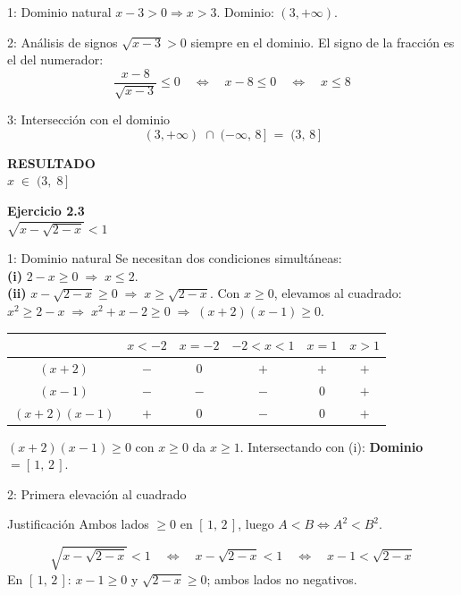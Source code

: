\documentclass[letterpaper, 11pt]{article}
\newcommand{\exheader}[2]{%
    \begin{tcolorbox}[colback=azulFuerte!12, colframe=azulFuerte,
        arc=8pt, boxrule=1.5pt, enhanced]
        {\large\textbf{\color{azulFuerte}Ejercicio #1}} \\[0.4em]
        \centering\LARGE $\displaystyle #2$
    \end{tcolorbox}
    \smallskip}
\newcommand{\resultado}[1]{%
    \begin{tcolorbox}[colback=azulFuerte, colframe=azulFuerte, colupper=white,
        arc=8pt, boxrule=1.5pt, enhanced, drop shadow={black!12}]
        \centering\large\textbf{RESULTADO} \\[0.4em]
        \LARGE $\displaystyle #1$
    \end{tcolorbox}}
\begin{document}
\begin{paso}{1: Dominio natural}
$x - 3 > 0 \Rightarrow x > 3$. Dominio: $(3,+\infty)$.
\end{paso}

\begin{paso}{2: Análisis de signos}
$\sqrt{x-3} > 0$ siempre en el dominio. El signo de la fracción es el del numerador:
\[
    \frac{x-8}{\sqrt{x-3}} \leq 0
    \quad\Longleftrightarrow\quad
    x - 8 \leq 0
    \quad\Longleftrightarrow\quad
    x \leq 8
\]
\end{paso}

\begin{paso}{3: Intersección con el dominio}
\[
    (3,+\infty) \;\cap\; (-\infty,\,8\,] \;=\; (3,\,8\,]
\]
\end{paso}

\resultado{x \;\in\; (3,\;8\,]}

\clearpage

\exheader{2.3}{\sqrt{x - \sqrt{2-x}} < 1}

\begin{paso}{1: Dominio natural}
Se necesitan dos condiciones simultáneas:\\[0.3em]
\textbf{(i)} $2 - x \geq 0 \;\Rightarrow\; x \leq 2$.\\[0.2em]
\textbf{(ii)} $x - \sqrt{2-x} \geq 0 \;\Rightarrow\; x \geq \sqrt{2-x}$.
Con $x \geq 0$, elevamos al cuadrado: $x^2 \geq 2-x \;\Rightarrow\; x^2+x-2 \geq 0
\;\Rightarrow\; (x+2)(x-1) \geq 0$.

\begin{center}
\renewcommand{\arraystretch}{1.5}
\begin{tabular}{c|ccccc}
    & $x{<}{-2}$ & $x{=}{-2}$ & $-2{<}x{<}1$ & $x{=}1$ & $x{>}1$ \\
\hline
$(x+2)$ & $-$ & $0$ & $+$ & $+$ & $+$ \\
$(x-1)$ & $-$ & $-$ & $-$ & $0$ & $+$ \\
\hline
\rowcolor{celesteSuave}
$(x+2)(x-1)$ & $+$ & $0$ & $-$ & $0$ & $+$ \\
\end{tabular}
\end{center}

$(x+2)(x-1) \geq 0$ con $x \geq 0$ da $x \geq 1$. Intersectando con (i): \textbf{Dominio} $= [\,1,\,2\,]$.
\end{paso}

\begin{paso}{2: Primera elevación al cuadrado}
\begin{justif}{Justificación}
Ambos lados $\geq 0$ en $[\,1,\,2\,]$, luego $A < B \Leftrightarrow A^2 < B^2$.
\end{justif}
\[
    \sqrt{x - \sqrt{2-x}} < 1
    \quad\Longleftrightarrow\quad
    x - \sqrt{2-x} < 1
    \quad\Longleftrightarrow\quad
    x - 1 < \sqrt{2-x}
\]
En $[\,1,\,2\,]$: $x-1 \geq 0$ y $\sqrt{2-x} \geq 0$; ambos lados no negativos.
\end{paso}
\end{document}
